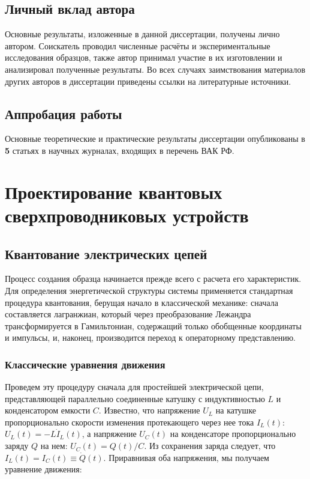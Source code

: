 \documentclass[14pt, a4paper]{extreport}
\numberwithin{equation}{section}
\begin{document}
\section*{Личный вклад автора}

Основные результаты, изложенные в данной диссертации, получены лично автором. Соискатель проводил численные расчёты и экспериментальные исследования образцов, также автор принимал участие в
их изготовлении и анализировал полученные результаты. Во всех случаях
заимствования материалов других авторов в диссертации приведены ссылки
на литературные источники.

\section*{Аппробация работы}

Основные теоретические и практические результаты диссертации
опубликованы в \textbf{5} статьях в научных журналах, входящих в перечень ВАК
РФ.


\chapter{Проектирование квантовых сверхпроводниковых устройств}

\section{Квантование электрических цепей}


Процесс создания образца начинается прежде всего с расчета его характеристик. Для определения энергетической структуры системы применяется стандартная процедура квантования, берущая начало в классической механике: сначала составляется лагранжиан, который через преобразование Лежандра трансформируется в Гамильтониан, содержащий только обобщенные координаты и импульсы, и, наконец, производится переход к операторному представлению. 

\subsection{Классические уравнения движения}


Проведем эту процедуру сначала для простейшей электрической цепи, представляющей параллельно соединенные катушку с индуктивностью $L$ и конденсатором емкости $C$. Известно, что напряжение $U_L$ на катушке пропорционально скорости изменения протекающего через нее тока $I_L(t)$: $U_L(t) = - L \dot I_L(t)$, а напряжение $U_C(t)$ на конденсаторе пропорционально заряду $Q$ на нем: $U_C(t) = Q(t)/C$. Из сохранения заряда следует, что $I_L(t) = I_C(t) \equiv \dot Q(t)$. Приравнивая оба напряжения, мы получаем уравнение движения:
\end{document}

